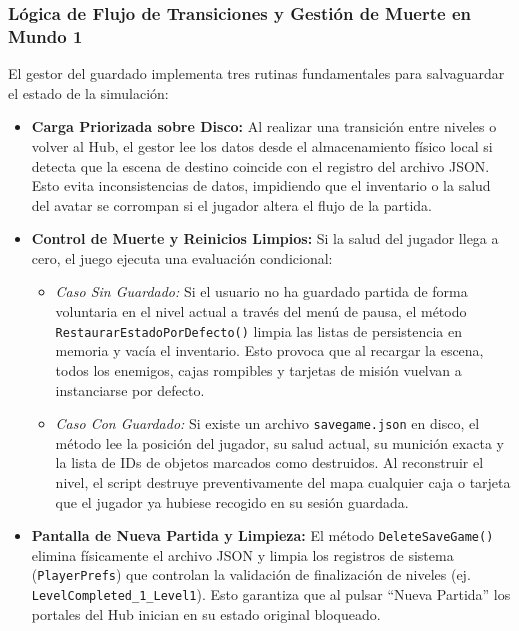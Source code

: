 \subsubsection{Lógica de Flujo de Transiciones y Gestión de Muerte en Mundo 1}
El gestor del guardado implementa tres rutinas fundamentales para salvaguardar el estado de la simulación:
\begin{itemize}
    \item \textbf{Carga Priorizada sobre Disco:} Al realizar una transición entre niveles o volver al Hub, el gestor lee los datos desde el almacenamiento físico local si detecta que la escena de destino coincide con el registro del archivo JSON. Esto evita inconsistencias de datos, impidiendo que el inventario o la salud del avatar se corrompan si el jugador altera el flujo de la partida.
    \item \textbf{Control de Muerte y Reinicios Limpios:} Si la salud del jugador llega a cero, el juego ejecuta una evaluación condicional:
    \begin{itemize}
        \item \textit{Caso Sin Guardado:} Si el usuario no ha guardado partida de forma voluntaria en el nivel actual a través del menú de pausa, el método \texttt{RestaurarEstadoPorDefecto()} limpia las listas de persistencia en memoria y vacía el inventario. Esto provoca que al recargar la escena, todos los enemigos, cajas rompibles y tarjetas de misión vuelvan a instanciarse por defecto.
        \item \textit{Caso Con Guardado:} Si existe un archivo \texttt{savegame.json} en disco, el método lee la posición del jugador, su salud actual, su munición exacta y la lista de IDs de objetos marcados como destruidos. Al reconstruir el nivel, el script destruye preventivamente del mapa cualquier caja o tarjeta que el jugador ya hubiese recogido en su sesión guardada.
    \end{itemize}
    \item \textbf{Pantalla de Nueva Partida y Limpieza:} El método \texttt{DeleteSaveGame()} elimina físicamente el archivo JSON y limpia los registros de sistema (\texttt{PlayerPrefs}) que controlan la validación de finalización de niveles (ej. \texttt{LevelCompleted\_1\_Level1}). Esto garantiza que al pulsar ``Nueva Partida'' los portales del Hub inician en su estado original bloqueado.
\end{itemize}

